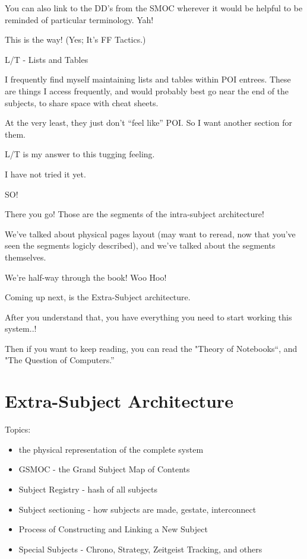 \documentclass[oneside]{book}
\begin{document}
You can also link to the DD's from the SMOC wherever it would be
helpful to be reminded of particular terminology. Yah!

This is the way! (Yes; It's FF Tactics.)


L/T - Lists and Tables

  I frequently find myself maintaining lists and tables within POI
entrees. These are things I access frequently, and would probably best
go near the end of the subjects, to share space with cheat sheets.

  At the very least, they just don't ``feel like'' POI. So I want
another section for them.

  L/T is my answer to this tugging feeling.

  I have not tried it yet.


  SO!

  There you go! Those are the segments of the intra-subject
architecture!

  We've talked about physical pages layout (may want to reread, now
that you've seen the segments logicly described), and we've talked
about the segments themselves.

  We're half-way through the book! Woo Hoo!

  Coming up next, is the Extra-Subject architecture.

  After you understand that, you have everything you need to start
working this system..!

  Then if you want to keep reading, you can read the "Theory of
Notebooks``, and "The Question of Computers.''


\chapter{Extra-Subject Architecture}
Topics:

\begin{itemize}
\item the physical representation of the complete system
\item GSMOC - the Grand Subject Map of Contents
\item Subject Registry - hash of all subjects
\item Subject sectioning - how subjects are made, gestate, interconnect
\item Process of Constructing and Linking a New Subject
\item Special Subjects - Chrono, Strategy, Zeitgeist Tracking, and others
\end{itemize}
\end{document}
